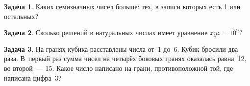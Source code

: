 \documentclass[a4paper,11pt]{article}%
\theoremstyle{definition}%
\newtheorem{Ex}{\hspace{-25pt}\fbox{\phantom{123}} Задача}%
\begin{document}
%
\iffalse%
Автор: 25 школа%
Дата: 01.11.2012%
Название: None%
Подсказка: \textbackslash{}\textbackslash{}%
nan%
\fi%
%
\begin{Ex}%
Каких семизначных чисел больше: тех, в записи которых есть 1 или
остальных?%
%
\end{Ex}%
%
\iffalse%
Автор: 25 школа%
Дата: 01.11.2012%
Название: None%
Подсказка: \textbackslash{}\textbackslash{}%
nan%
\fi%
%
\begin{Ex}%
Сколько решений в натуральных числах имеет уравнение $x y z=10^{9}$?%
%
\end{Ex}%
%
\iffalse%
Автор: Дмитрий Трущин%
Дата: 01.10.2013%
Название: None%
Подсказка: \textbackslash{}\textbackslash{}%
nan%
\fi%
%
\begin{Ex}%
На гранях кубика расставлены числа от 1 до 6. Кубик бросили два раза. В первый раз сумма чисел на четырёх боковых гранях оказалась равна 12, во второй — 15. Какое число написано на грани, противоположной той, где написана цифра 3? %
%
\end{Ex}%
%
\iffalse%
Автор: Дарья Анзон%
Дата: 01.07.2017%
Название: None%
Подсказка: \textbackslash{}\textbackslash{}%
nan%
\fi%
%
\end{document}
